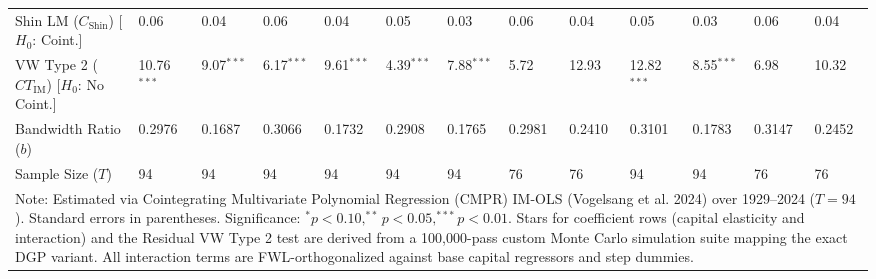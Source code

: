 \begin{table}[H]
\begin{tabular}{p{3.8cm}p{1.1cm}p{1.1cm}p{1.1cm}p{1.1cm}p{1.1cm}p{1.1cm}p{1.1cm}p{1.1cm}p{1.1cm}p{1.1cm}p{1.1cm}p{1.1cm}}
Shin LM ($C_{\text{Shin}}$) [$H_0$: Coint.] & 0.06 & 0.04 & 0.06 & 0.04 & 0.05 & 0.03 & 0.06 & 0.04 & 0.05 & 0.03 & 0.06 & 0.04 \\
VW Type 2 ($CT_{\text{IM}}$) [$H_0$: No Coint.] & 10.76$^{***}$ & 9.07$^{***}$ & 6.17$^{***}$ & 9.61$^{***}$ & 4.39$^{***}$ & 7.88$^{***}$ & 5.72 & 12.93 & 12.82$^{***}$ & 8.55$^{***}$ & 6.98 & 10.32 \\
\midrule
Bandwidth Ratio ($b$) & 0.2976 & 0.1687 & 0.3066 & 0.1732 & 0.2908 & 0.1765 & 0.2981 & 0.2410 & 0.3101 & 0.1783 & 0.3147 & 0.2452 \\
Sample Size ($T$) & 94 & 94 & 94 & 94 & 94 & 94 & 76 & 76 & 94 & 94 & 76 & 76 \\
\bottomrule
\multicolumn{13}{p{14.5cm}}{\footnotesize Note: Estimated via Cointegrating Multivariate Polynomial Regression (CMPR) IM-OLS (Vogelsang et al. 2024) over 1929--2024 ($T=94$). Standard errors in parentheses. Significance: $^* p < 0.10, ^{**} p < 0.05, ^{***} p < 0.01$. Stars for coefficient rows (capital elasticity and interaction) and the Residual VW Type 2 test are derived from a 100,000-pass custom Monte Carlo simulation suite mapping the exact DGP variant. All interaction terms are FWL-orthogonalized against base capital regressors and step dummies.}
\end{tabular}
\end{table}
